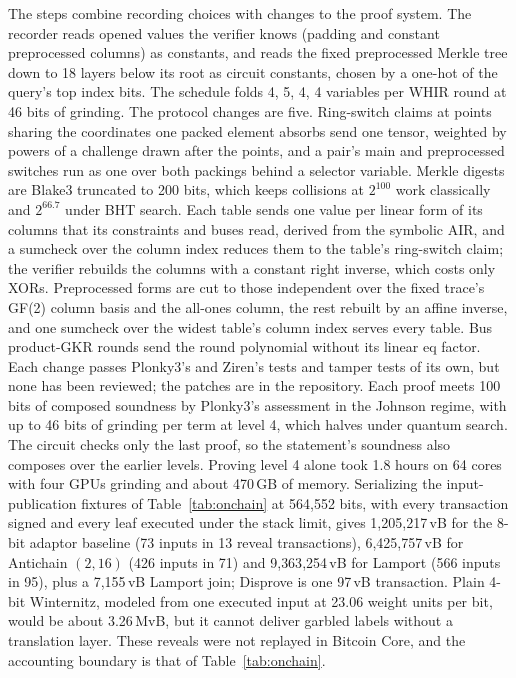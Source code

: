 \documentclass[11pt]{article}
\newcommand{\XOR}{\textsf{XOR}}
\begin{document}
The steps combine recording choices with changes to the proof system. The
recorder reads opened values the verifier knows (padding and constant
preprocessed columns) as constants, and reads the fixed preprocessed Merkle
tree down to 18 layers below its root as circuit constants, chosen by a one-hot
of the query's top index bits. The schedule folds 4, 5, 4, 4 variables per WHIR
round at 46 bits of grinding. The protocol changes are five. Ring-switch claims
at points sharing the coordinates one packed element absorbs send one tensor,
weighted by powers of a challenge drawn after the points, and a pair's main and
preprocessed switches run as one over both packings behind a selector variable.
Merkle digests are Blake3 truncated to 200 bits, which keeps collisions at
$2^{100}$ work classically and $2^{66.7}$ under BHT search. Each table sends one
value per linear form of its columns that its constraints and buses read,
derived from the symbolic AIR, and a sumcheck over the column index reduces them
to the table's ring-switch claim; the verifier rebuilds the columns with a
constant right inverse, which costs only \XOR{}s. Preprocessed forms are cut
to those independent over the fixed trace's GF(2) column basis and the
all-ones column, the rest rebuilt by an affine inverse, and one sumcheck over
the widest table's column index serves every table. Bus product-GKR rounds send
the round polynomial without its linear eq factor. Each change passes Plonky3's
and Ziren's tests and tamper tests of its own, but none has been reviewed; the
patches are in the repository. Each proof meets 100 bits of composed soundness
by Plonky3's assessment in the Johnson regime, with up to 46 bits of grinding
per term at level 4, which halves under quantum search. The circuit checks only
the last proof, so the statement's soundness also composes over the earlier
levels. Proving level 4 alone took 1.8 hours on 64 cores with four GPUs
grinding and about 470\,GB of memory. Serializing the input-publication fixtures of
Table~\ref{tab:onchain} at 564{,}552 bits, with every transaction signed and
every leaf executed under the stack limit, gives 1{,}205{,}217\,vB for the 8-bit
adaptor baseline (73 inputs in 13 reveal transactions), 6{,}425{,}757\,vB for
Antichain $(2,16)$ (426 inputs in 71) and 9{,}363{,}254\,vB for Lamport (566
inputs in 95), plus a 7{,}155\,vB Lamport join; Disprove is one 97\,vB
transaction. Plain 4-bit Winternitz, modeled from one executed input at
23.06 weight units per bit, would be about 3.26\,MvB, but it cannot deliver
garbled labels without a translation layer. These reveals were not replayed in
Bitcoin Core, and the accounting boundary is that of
Table~\ref{tab:onchain}.
\end{document}
